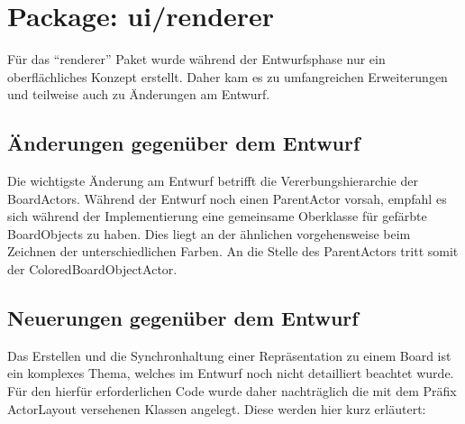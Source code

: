 \chapter{Package: ui/renderer}

Für das "`renderer"' Paket wurde während der Entwurfsphase nur ein oberflächliches Konzept erstellt.
Daher kam es zu umfangreichen Erweiterungen und teilweise auch zu Änderungen am Entwurf.

\section{Änderungen gegenüber dem Entwurf}

Die wichtigste Änderung am Entwurf betrifft die Vererbungshierarchie der BoardActors. 
Während der Entwurf noch einen ParentActor vorsah, empfahl es sich während der Implementierung eine gemeinsame Oberklasse für gefärbte BoardObjects zu haben.
Dies liegt an der ähnlichen vorgehensweise beim Zeichnen der unterschiedlichen Farben.
An die Stelle des ParentActors tritt somit der ColoredBoardObjectActor.

\section{Neuerungen gegenüber dem Entwurf}

Das Erstellen und die Synchronhaltung einer Repräsentation zu einem Board ist ein komplexes Thema, welches im Entwurf noch nicht detailliert beachtet wurde.
Für den hierfür erforderlichen Code wurde daher nachträglich die mit dem Präfix ActorLayout versehenen Klassen angelegt.
Diese werden hier kurz erläutert:

